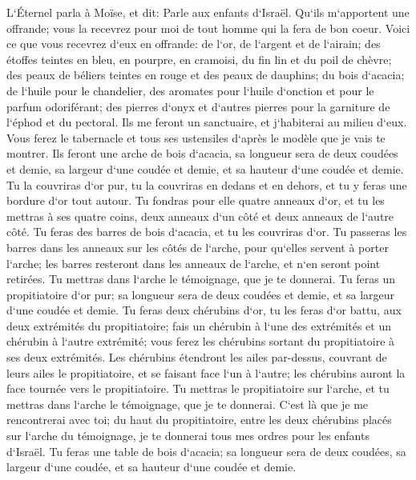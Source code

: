 \verse L`Éternel parla à Moïse, et dit: 
\verse Parle aux enfants d`Israël. Qu`ils m`apportent une offrande; vous la recevrez pour moi de tout homme qui la fera de bon coeur. 
\verse Voici ce que vous recevrez d`eux en offrande: de l`or, de l`argent et de l`airain; 
\verse des étoffes teintes en bleu, en pourpre, en cramoisi, du fin lin et du poil de chèvre; 
\verse des peaux de béliers teintes en rouge et des peaux de dauphins; du bois d`acacia; 
\verse de l`huile pour le chandelier, des aromates pour l`huile d`onction et pour le parfum odoriférant; 
\verse des pierres d`onyx et d`autres pierres pour la garniture de l`éphod et du pectoral. 
\verse Ils me feront un sanctuaire, et j`habiterai au milieu d`eux. 
\verse Vous ferez le tabernacle et tous ses ustensiles d`après le modèle que je vais te montrer. 
\verse Ils feront une arche de bois d`acacia, sa longueur sera de deux coudées et demie, sa largeur d`une coudée et demie, et sa hauteur d`une coudée et demie. 
\verse Tu la couvriras d`or pur, tu la couvriras en dedans et en dehors, et tu y feras une bordure d`or tout autour. 
\verse Tu fondras pour elle quatre anneaux d`or, et tu les mettras à ses quatre coins, deux anneaux d`un côté et deux anneaux de l`autre côté. 
\verse Tu feras des barres de bois d`acacia, et tu les couvriras d`or. 
\verse Tu passeras les barres dans les anneaux sur les côtés de l`arche, pour qu`elles servent à porter l`arche; 
\verse les barres resteront dans les anneaux de l`arche, et n`en seront point retirées. 
\verse Tu mettras dans l`arche le témoignage, que je te donnerai. 
\verse Tu feras un propitiatoire d`or pur; sa longueur sera de deux coudées et demie, et sa largeur d`une coudée et demie. 
\verse Tu feras deux chérubins d`or, tu les feras d`or battu, aux deux extrémités du propitiatoire; 
\verse fais un chérubin à l`une des extrémités et un chérubin à l`autre extrémité; vous ferez les chérubins sortant du propitiatoire à ses deux extrémités. 
\verse Les chérubins étendront les ailes par-dessus, couvrant de leurs ailes le propitiatoire, et se faisant face l`un à l`autre; les chérubins auront la face tournée vers le propitiatoire. 
\verse Tu mettras le propitiatoire sur l`arche, et tu mettras dans l`arche le témoignage, que je te donnerai. 
\verse C`est là que je me rencontrerai avec toi; du haut du propitiatoire, entre les deux chérubins placés sur l`arche du témoignage, je te donnerai tous mes ordres pour les enfants d`Israël. 
\verse Tu feras une table de bois d`acacia; sa longueur sera de deux coudées, sa largeur d`une coudée, et sa hauteur d`une coudée et demie. 
